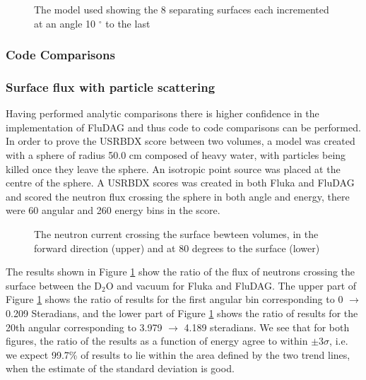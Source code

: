 \documentclass{anstrans}
\begin{document}
\begin{figure}[h!]
	\begin{center}
		\caption{The model used showing the 8 separating surfaces each
		incremented at an angle 10 $^{\circ}$ to the last}
	\end{center}
\end{figure}

\subsubsection{Code Comparisons}
\subsubsection*{Surface flux with particle scattering}
Having performed analytic comparisons there is higher confidence in the implementation of FluDAG and thus code to 
code comparisons can be performed. In order to prove the USRBDX score between two volumes, a model was created with
a sphere of radius 50.0 cm composed of heavy water, with particles being killed once they leave the sphere. An isotropic point source was placed at the centre of the sphere. A USRBDX scores was created in both Fluka and FluDAG and scored the neutron flux crossing the sphere in both angle and energy, there were 60 angular and 260 energy bins in the score. 
\begin{figure}[h!]
	\begin{center}
		\caption{The neutron current crossing the surface bewteen volumes, in the 
		forward direction (upper) and at 80 degrees to the surface (lower)}
	\end{center}
\label{mat_usrbdx}
\end{figure}
The results shown in Figure \ref{mat_usrbdx} show the ratio of the flux of neutrons crossing the surface between the D$_2$O and vacuum for Fluka and FluDAG. The upper part of Figure \ref{mat_usrbdx} shows the ratio of results for the first angular bin corresponding to 0 $\to$ 0.209 Steradians, and the lower part of Figure \ref{mat_usrbdx} shows the ratio of results for the 20th angular corresponding to 3.979 $\to$ 4.189 steradians. We see that for both figures, the ratio of the results as a function of energy agree to within $\pm 3\sigma$, i.e. we expect 99.7\% of results to lie within the area defined by the two trend lines, when the estimate of the standard deviation is good.
\end{document}
